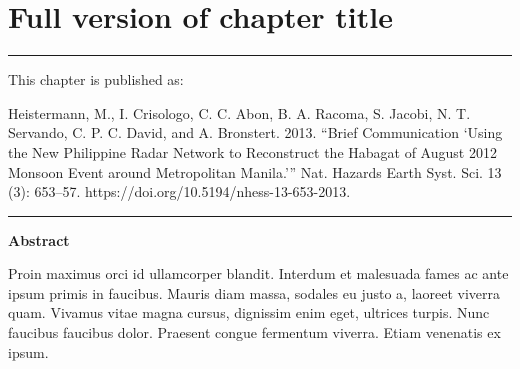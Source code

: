 
\chapter[Short version of title for header]{Full version of chapter title} %

% 

\label{Chapter2} %



\noindent \rule{\textwidth}{0.4pt}

\medskip

\noindent This chapter is published as:

\medskip

\noindent \hangindent=0.6cm Heistermann, M., I. Crisologo, C. C. Abon, B. A. Racoma, S. Jacobi, N. T. Servando, C. P. C. David, and A. Bronstert. 2013. “Brief Communication ‘Using the New Philippine Radar Network to Reconstruct the Habagat of August 2012 Monsoon Event around Metropolitan Manila.’” Nat. Hazards Earth Syst. Sci. 13 (3): 653–57. https://doi.org/10.5194/nhess-13-653-2013.



\noindent\rule{\textwidth}{0.4pt}

\bigskip


\noindent \textbf{Abstract}

\medskip

\noindent
Proin maximus orci id ullamcorper blandit. Interdum et malesuada fames ac ante ipsum primis in faucibus. Mauris diam massa, sodales eu justo a, laoreet viverra quam. Vivamus vitae magna cursus, dignissim enim eget, ultrices turpis. Nunc faucibus faucibus dolor. Praesent congue fermentum viverra. Etiam venenatis ex ipsum.


\bigskip


